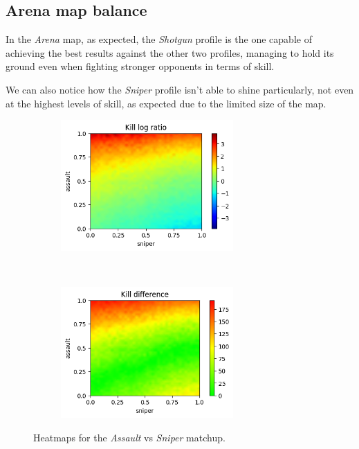 \subsection{Arena map balance}

In the \textit{Arena} map, as expected, the \textit{Shotgun} profile is the one capable of achieving the best results against the other two profiles, managing to hold its ground even when fighting stronger opponents in terms of skill.

We can also notice how the \textit{Sniper} profile isn't able to shine particularly, not even at the highest levels of skill, as expected due to the limited size of the map.

\begin{figure}[H]
    \centering
    \begin{subfigure}[t]{0.5\textwidth}
        \centering
        \includegraphics[height=5cm]{Images/images/heatmaps/short-range/assault_sniper_heatmap_ratio.png}
    \end{subfigure}%
    ~ 
    \begin{subfigure}[t]{0.5\textwidth}
        \centering
        \includegraphics[height=5cm]{Images/images/heatmaps/short-range/assault_sniper_heatmap_diff.png}
    \end{subfigure}
    \caption{Heatmaps for the \textit{Assault} vs \textit{Sniper} matchup.}
    \label{fig:balance_assault_sniper_short}
\end{figure}

